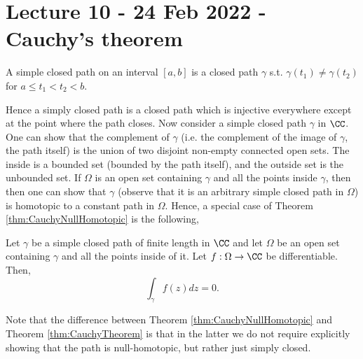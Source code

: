 \section{Lecture 10 - 24 Feb 2022 - Cauchy's theorem}
\begin{definition}
  A simple closed path on an interval $[a,b]$ is a closed path $\gamma$ s.t.
  $\gamma(t_1)\neq \gamma(t_2)$ for $a\leq t_1<t_2< b$.
  \label{def:simpleClosedPath}
\end{definition}
Hence a simply closed path is a closed path which is injective everywhere except
at the point where the path closes. Now consider a simple closed path $\gamma$
in $\CC$. One can show that the complement of $\gamma$ (i.e. the complement of
the image of $\gamma$, the path itself) is the union of two disjoint non-empty
connected open sets. The inside is a bounded set (bounded by the path itself),
and the outside set is the unbounded set. If $\Omega$ is an open set containing
$\gamma$ and all the points inside $\gamma$, then then one can show that
$\gamma$ (observe that it is an arbitrary simple closed path in $\Omega$) is
homotopic to a constant path in $\Omega$. Hence, a special case of Theorem
\ref{thm:CauchyNullHomotopic} is the following,
\begin{theorem}
  Let $\gamma$ be a simple closed path of finite length in $\CC$ and let
  $\Omega$ be an open set containing $\gamma$ and all the points inside of it.
  Let $f:\Omega\to\CC$ be differentiable. Then,
  \[\int_{\gamma} f(z)dz = 0.\]
  \label{thm:CauchyTheorem}
\end{theorem}
Note that the difference between Theorem \ref{thm:CauchyNullHomotopic} and
Theorem \ref{thm:CauchyTheorem} is that in the latter we do not require
explicitly showing that the path is null-homotopic, but rather just simply
closed.
